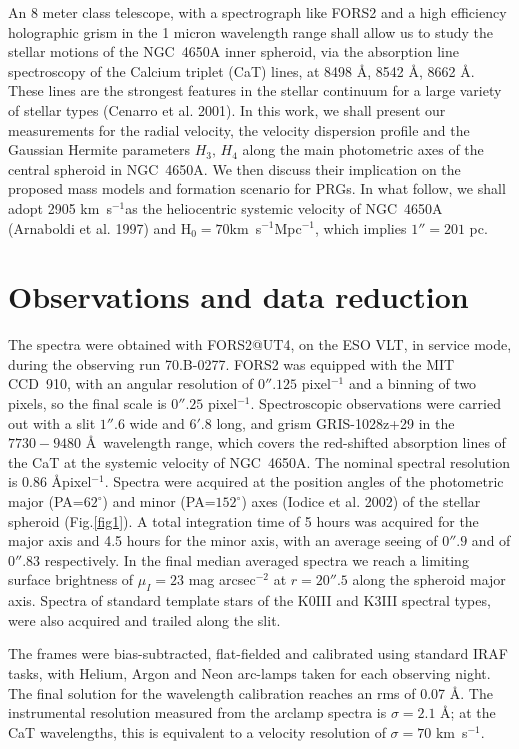 \documentclass[12pt,preprint]{aastex}
\newcommand{\kms}{\mbox{km~s$^{-1}$}}
\begin{document}
An 8 meter class telescope, with a spectrograph like FORS2 and a high
efficiency holographic grism in the 1 micron wavelength range shall
allow us to study the stellar motions of the NGC~4650A inner spheroid,
via the absorption line spectroscopy of the Calcium triplet (CaT)
lines, at 8498 \AA, 8542 \AA, 8662 \AA.  These lines are the strongest
features in the stellar continuum for a large variety of stellar types
(Cenarro et al. 2001).  In this work, we shall present our
measurements for the radial velocity, the velocity dispersion profile
and the Gaussian Hermite parameters $H_3,\, H_4$ along the main
photometric axes of the central spheroid in NGC~4650A.  We then
discuss their implication on the proposed mass models and formation
scenario for PRGs. In what follow, we shall adopt 2905 \kms as the
heliocentric systemic velocity of NGC~4650A (Arnaboldi et
al. 1997) and H$_0 = 70$\kms Mpc$^{-1}$, which implies $1''= 201$ pc.


\section{Observations and data reduction}\label{data}

The spectra were obtained with FORS2@UT4, on the ESO VLT, in service
mode, during the observing run 70.B-0277. FORS2 was equipped with the
MIT CCD~910, with an angular resolution of $0''.125$ pixel$^{-1}$ and
a binning of two pixels, so the final scale is $0''.25$
pixel$^{-1}$. Spectroscopic observations were carried out with a slit
$1''.6$ wide and $6'.8$ long, and grism GRIS-1028z+29 in the
$7730-9480$ \AA\ wavelength range, which covers the red-shifted
absorption lines of the CaT at the systemic velocity of NGC~4650A. The
nominal spectral resolution is 0.86 \AA pixel$^{-1}$.  Spectra were
acquired at the position angles of the photometric major
(PA=$62^{\circ}$) and minor (PA=$152^{\circ}$) axes (Iodice et
al. 2002) of the stellar spheroid (Fig.\ref{fig1}). A total
integration time of 5 hours was acquired for the major axis and 4.5
hours for the minor axis, with an average seeing of $0''.9$ and of
$0''.83$ respectively. In the final median averaged spectra we reach a
limiting surface brightness of $\mu_I = 23$ mag arcsec$^{-2}$ at $r =
20''.5$ along the spheroid major axis. Spectra of standard template
stars of the K0III and K3III spectral types, were also acquired and
trailed along the slit.

The frames were bias-subtracted, flat-fielded and calibrated using
standard IRAF tasks, with Helium, Argon and Neon arc-lamps taken for
each observing night. The final solution for the wavelength
calibration reaches an rms of 0.07 \AA. The instrumental resolution
measured from the arclamp spectra is $\sigma =2.1$ \AA; at the CaT
wavelengths, this is equivalent to a velocity resolution of $\sigma =
70$ \kms.
\end{document}
